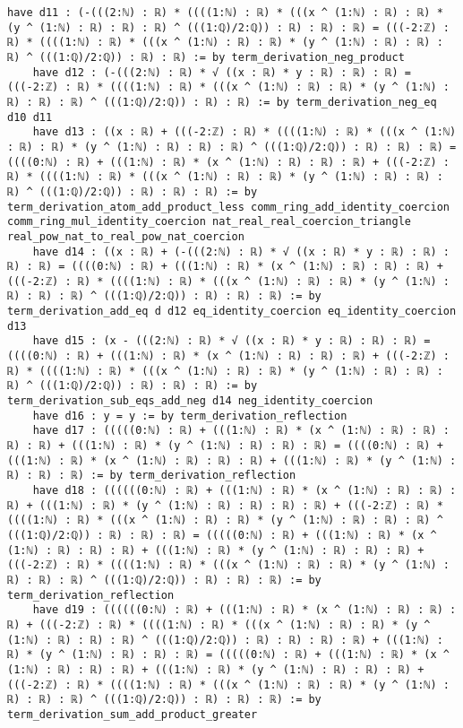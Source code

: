 \documentclass{article}
\begin{document}
\begin{tcolorbox}[colback=white!10, width=\linewidth]
\begin{lstlisting}[language=Lean4]
    have d11 : (-(((2:ℕ) : ℝ) * ((((1:ℕ) : ℝ) * (((x ^ (1:ℕ) : ℝ) : ℝ) * (y ^ (1:ℕ) : ℝ) : ℝ) : ℝ) ^ (((1:ℚ)/2:ℚ)) : ℝ) : ℝ) : ℝ) = (((-2:ℤ) : ℝ) * ((((1:ℕ) : ℝ) * (((x ^ (1:ℕ) : ℝ) : ℝ) * (y ^ (1:ℕ) : ℝ) : ℝ) : ℝ) ^ (((1:ℚ)/2:ℚ)) : ℝ) : ℝ) := by term_derivation_neg_product
    have d12 : (-(((2:ℕ) : ℝ) * √ ((x : ℝ) * y : ℝ) : ℝ) : ℝ) = (((-2:ℤ) : ℝ) * ((((1:ℕ) : ℝ) * (((x ^ (1:ℕ) : ℝ) : ℝ) * (y ^ (1:ℕ) : ℝ) : ℝ) : ℝ) ^ (((1:ℚ)/2:ℚ)) : ℝ) : ℝ) := by term_derivation_neg_eq d10 d11
    have d13 : ((x : ℝ) + (((-2:ℤ) : ℝ) * ((((1:ℕ) : ℝ) * (((x ^ (1:ℕ) : ℝ) : ℝ) * (y ^ (1:ℕ) : ℝ) : ℝ) : ℝ) ^ (((1:ℚ)/2:ℚ)) : ℝ) : ℝ) : ℝ) = ((((0:ℕ) : ℝ) + (((1:ℕ) : ℝ) * (x ^ (1:ℕ) : ℝ) : ℝ) : ℝ) + (((-2:ℤ) : ℝ) * ((((1:ℕ) : ℝ) * (((x ^ (1:ℕ) : ℝ) : ℝ) * (y ^ (1:ℕ) : ℝ) : ℝ) : ℝ) ^ (((1:ℚ)/2:ℚ)) : ℝ) : ℝ) : ℝ) := by term_derivation_atom_add_product_less comm_ring_add_identity_coercion comm_ring_mul_identity_coercion nat_real_real_coercion_triangle real_pow_nat_to_real_pow_nat_coercion
    have d14 : ((x : ℝ) + (-(((2:ℕ) : ℝ) * √ ((x : ℝ) * y : ℝ) : ℝ) : ℝ) : ℝ) = ((((0:ℕ) : ℝ) + (((1:ℕ) : ℝ) * (x ^ (1:ℕ) : ℝ) : ℝ) : ℝ) + (((-2:ℤ) : ℝ) * ((((1:ℕ) : ℝ) * (((x ^ (1:ℕ) : ℝ) : ℝ) * (y ^ (1:ℕ) : ℝ) : ℝ) : ℝ) ^ (((1:ℚ)/2:ℚ)) : ℝ) : ℝ) : ℝ) := by term_derivation_add_eq d d12 eq_identity_coercion eq_identity_coercion d13
    have d15 : (x - (((2:ℕ) : ℝ) * √ ((x : ℝ) * y : ℝ) : ℝ) : ℝ) = ((((0:ℕ) : ℝ) + (((1:ℕ) : ℝ) * (x ^ (1:ℕ) : ℝ) : ℝ) : ℝ) + (((-2:ℤ) : ℝ) * ((((1:ℕ) : ℝ) * (((x ^ (1:ℕ) : ℝ) : ℝ) * (y ^ (1:ℕ) : ℝ) : ℝ) : ℝ) ^ (((1:ℚ)/2:ℚ)) : ℝ) : ℝ) : ℝ) := by term_derivation_sub_eqs_add_neg d14 neg_identity_coercion
    have d16 : y = y := by term_derivation_reflection
    have d17 : (((((0:ℕ) : ℝ) + (((1:ℕ) : ℝ) * (x ^ (1:ℕ) : ℝ) : ℝ) : ℝ) : ℝ) + (((1:ℕ) : ℝ) * (y ^ (1:ℕ) : ℝ) : ℝ) : ℝ) = ((((0:ℕ) : ℝ) + (((1:ℕ) : ℝ) * (x ^ (1:ℕ) : ℝ) : ℝ) : ℝ) + (((1:ℕ) : ℝ) * (y ^ (1:ℕ) : ℝ) : ℝ) : ℝ) := by term_derivation_reflection
    have d18 : ((((((0:ℕ) : ℝ) + (((1:ℕ) : ℝ) * (x ^ (1:ℕ) : ℝ) : ℝ) : ℝ) + (((1:ℕ) : ℝ) * (y ^ (1:ℕ) : ℝ) : ℝ) : ℝ) : ℝ) + (((-2:ℤ) : ℝ) * ((((1:ℕ) : ℝ) * (((x ^ (1:ℕ) : ℝ) : ℝ) * (y ^ (1:ℕ) : ℝ) : ℝ) : ℝ) ^ (((1:ℚ)/2:ℚ)) : ℝ) : ℝ) : ℝ) = (((((0:ℕ) : ℝ) + (((1:ℕ) : ℝ) * (x ^ (1:ℕ) : ℝ) : ℝ) : ℝ) + (((1:ℕ) : ℝ) * (y ^ (1:ℕ) : ℝ) : ℝ) : ℝ) + (((-2:ℤ) : ℝ) * ((((1:ℕ) : ℝ) * (((x ^ (1:ℕ) : ℝ) : ℝ) * (y ^ (1:ℕ) : ℝ) : ℝ) : ℝ) ^ (((1:ℚ)/2:ℚ)) : ℝ) : ℝ) : ℝ) := by term_derivation_reflection
    have d19 : ((((((0:ℕ) : ℝ) + (((1:ℕ) : ℝ) * (x ^ (1:ℕ) : ℝ) : ℝ) : ℝ) + (((-2:ℤ) : ℝ) * ((((1:ℕ) : ℝ) * (((x ^ (1:ℕ) : ℝ) : ℝ) * (y ^ (1:ℕ) : ℝ) : ℝ) : ℝ) ^ (((1:ℚ)/2:ℚ)) : ℝ) : ℝ) : ℝ) : ℝ) + (((1:ℕ) : ℝ) * (y ^ (1:ℕ) : ℝ) : ℝ) : ℝ) = (((((0:ℕ) : ℝ) + (((1:ℕ) : ℝ) * (x ^ (1:ℕ) : ℝ) : ℝ) : ℝ) + (((1:ℕ) : ℝ) * (y ^ (1:ℕ) : ℝ) : ℝ) : ℝ) + (((-2:ℤ) : ℝ) * ((((1:ℕ) : ℝ) * (((x ^ (1:ℕ) : ℝ) : ℝ) * (y ^ (1:ℕ) : ℝ) : ℝ) : ℝ) ^ (((1:ℚ)/2:ℚ)) : ℝ) : ℝ) : ℝ) := by term_derivation_sum_add_product_greater

\end{lstlisting}
\end{tcolorbox}
\end{document}

